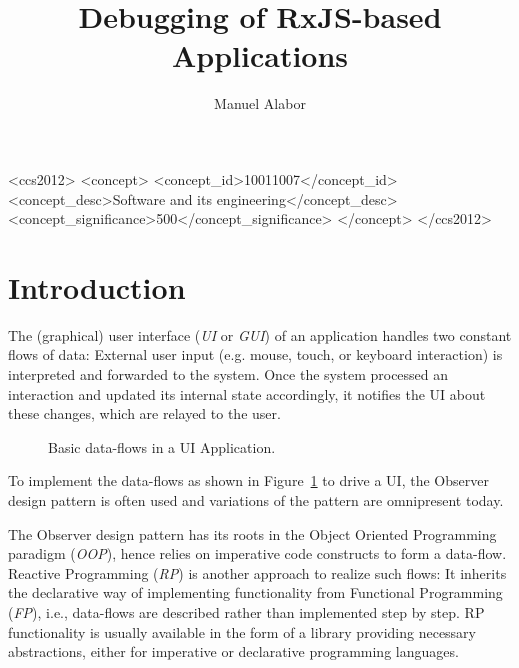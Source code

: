 \documentclass[sigplan,screen,review]{acmart}
\title{Debugging of RxJS-based Applications}
\author{Manuel Alabor}
\affiliation{
	\institution{HSR University of Applied Sciences}
	\city{Rapperswil}
	\country{Switzerland}
}
\begin{document}
\begin{abstract}
	
\end{abstract}

\begin{CCSXML}
	<ccs2012>
	   <concept>
		   <concept_id>10011007</concept_id>
		   <concept_desc>Software and its engineering</concept_desc>
		   <concept_significance>500</concept_significance>
		   </concept>
	 </ccs2012>
\end{CCSXML}



\maketitle

\section{Introduction}

The (graphical) user interface (\emph{UI} or \emph{GUI}) of an application handles two constant flows of data: External user input (e.g. mouse, touch, or keyboard interaction) is interpreted and forwarded to the system. Once the system processed an interaction and updated its internal state accordingly, it notifies the UI about these changes, which are relayed to the user.

\begin{figure}
	\centering
	\caption{Basic data-flows in a UI Application.}
	\label{fig:ui-data-flows}
\end{figure}

To implement the data-flows as shown in Figure~\ref{fig:ui-data-flows} to drive a UI, the Observer design pattern\cite{gamma1995design} is often used and variations of the pattern are omnipresent today\cite{alabor:2019:reactiveappllications}.

The Observer design pattern has its roots in the Object Oriented Programming paradigm (\emph{OOP}), hence relies on imperative code constructs to form a data-flow. Reactive Programming (\emph{RP}) is another approach to realize such flows: It inherits the declarative way of implementing functionality from Functional Programming (\emph{FP}), i.e., data-flows are described rather than implemented step by step\cite{10.1145/2501654.2501666}. RP functionality is usually available in the form of a library providing necessary abstractions, either for imperative or declarative programming languages.
\end{document}
